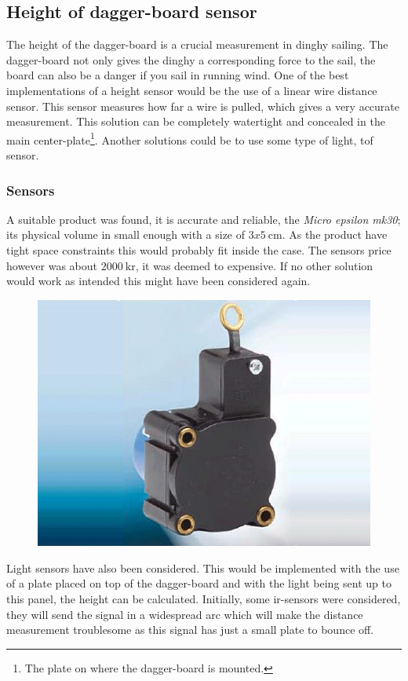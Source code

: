 \subsection{Height of dagger-board sensor}
The height of the dagger-board is a crucial measurement in dinghy sailing. The dagger-board not only gives the dinghy a corresponding force to the sail, the board can also be a danger if you sail in running wind. One of the best implementations of a height sensor would be the use of a linear wire distance sensor. This sensor measures how far a wire is pulled, which gives a very accurate measurement. This solution can be completely watertight and concealed in the main center-plate\footnote{The plate on where the dagger-board is mounted.}. Another solutions could be to use some type of light, \gls{tof} sensor. 

\subsubsection{Sensors}
A suitable product was found, it is accurate and reliable, the \emph{Micro epsilon mk30}; its physical volume in small enough with a size of $3x5~\textrm{cm}$. As the product have tight space constraints this would probably fit inside the case. The sensors price however was about $2000~\textrm{kr}$, it was deemed to expensive. If no other solution would work as intended this might have been considered again.
\begin{figure}[H]
\begin{center}
	\includegraphics[width = .45\textwidth]{Figures/microepsilon_mk30.png}
	\label{Draw_sensor}
\end{center}
\end{figure}

Light sensors have also been considered. This would be implemented with the use of a plate placed on top of the dagger-board and with the light being sent up to this panel, the height can be calculated. Initially, some \gls{ir}-sensors were considered,  they will send the signal in a widespread arc which will make the distance measurement troublesome as this signal has just a small plate to bounce off.

